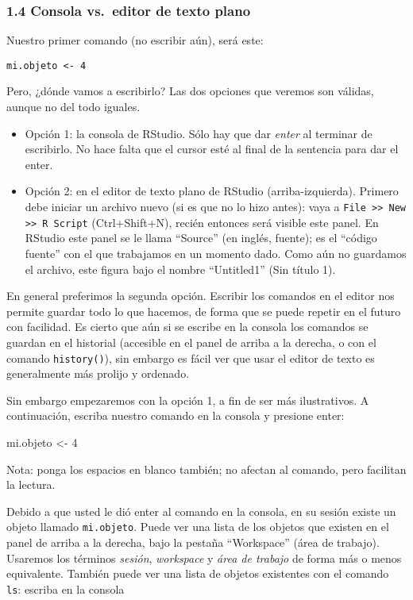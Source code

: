 \documentclass[]{article}
\newenvironment{Shaded}{}{}
\newcommand{\DecValTok}[1]{\textcolor[rgb]{0.25,0.63,0.44}{{#1}}}
\newcommand{\NormalTok}[1]{{#1}}
\begin{document}
\subsubsection{1.4 Consola vs.~editor de texto plano}

Nuestro primer comando (no escribir aún), será este:

\begin{verbatim}
mi.objeto <- 4
\end{verbatim}
Pero, ¿dónde vamos a escribirlo? Las dos opciones que veremos son
válidas, aunque no del todo iguales.

\begin{itemize}
\item
  Opción 1: la consola de RStudio. Sólo hay que dar \emph{enter} al
  terminar de escribirlo. No hace falta que el cursor esté al final de
  la sentencia para dar el enter.
\item
  Opción 2: en el editor de texto plano de RStudio (arriba-izquierda).
  Primero debe iniciar un archivo nuevo (si es que no lo hizo antes):
  vaya a
  \texttt{File \textgreater{}\textgreater{} New \textgreater{}\textgreater{} R Script}
  (Ctrl+Shift+N), recién entonces será visible este panel. En RStudio
  este panel se le llama ``Source'' (en inglés, fuente); es el ``código
  fuente'' con el que trabajamos en un momento dado. Como aún no
  guardamos el archivo, este figura bajo el nombre ``Untitled1'' (Sin
  título 1).
\end{itemize}
En general preferimos la segunda opción. Escribir los comandos en el
editor nos permite guardar todo lo que hacemos, de forma que se puede
repetir en el futuro con facilidad. Es cierto que aún si se escribe en
la consola los comandos se guardan en el historial (accesible en el
panel de arriba a la derecha, o con el comando \texttt{history()}), sin
embargo es fácil ver que usar el editor de texto es generalmente más
prolijo y ordenado.

Sin embargo empezaremos con la opción 1, a fin de ser más ilustrativos.
A continuación, escriba nuestro comando en la consola y presione enter:

\begin{Shaded}
\begin{Highlighting}[]
\NormalTok{mi.objeto <- }\DecValTok{4}
\end{Highlighting}
\end{Shaded}
Nota: ponga los espacios en blanco también; no afectan al comando, pero
facilitan la lectura.

Debido a que usted le dió enter al comando en la consola, en su sesión
existe un objeto llamado \texttt{mi.objeto}. Puede ver una lista de los
objetos que existen en el panel de arriba a la derecha, bajo la pestaña
``Workspace'' (área de trabajo). Usaremos los términos \emph{sesión},
\emph{workspace} y \emph{área de trabajo} de forma más o menos
equivalente. También puede ver una lista de objetos existentes con el
comando \texttt{ls}: escriba en la consola
\end{document}
